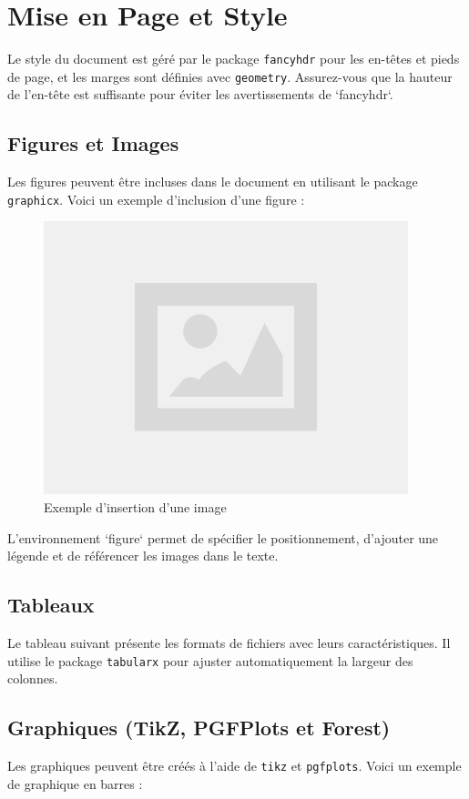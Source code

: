 \section{Mise en Page et Style}
Le style du document est géré par le package \texttt{fancyhdr} pour les en-têtes et pieds de page, et les marges sont définies avec \texttt{geometry}. Assurez-vous que la hauteur de l'en-tête est suffisante pour éviter les avertissements de `fancyhdr`.

\subsection{Figures et Images}
Les figures peuvent être incluses dans le document en utilisant le package \texttt{graphicx}. Voici un exemple d'inclusion d'une figure :

\begin{figure}[!ht]
    \centering
    \includegraphics[width=0.5\linewidth]{4_attachments/figures/empty_image.png}
    \caption{Exemple d'insertion d'une image}
    \label{fig:empty_image}
\end{figure}

L'environnement `figure` permet de spécifier le positionnement, d'ajouter une légende et de référencer les images dans le texte.

\subsection{Tableaux}
Le tableau suivant présente les formats de fichiers avec leurs caractéristiques. Il utilise le package \texttt{tabularx} pour ajuster automatiquement la largeur des colonnes.

\clearpage

\subsection{Graphiques (TikZ, PGFPlots et Forest)}
Les graphiques peuvent être créés à l'aide de \texttt{tikz} et \texttt{pgfplots}. Voici un exemple de graphique en barres :

